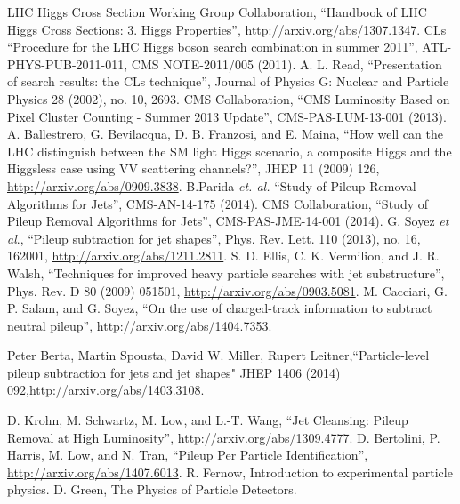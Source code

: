 \begin{thebibliography}{99}
 LHC Higgs Cross Section Working Group Collaboration, ``Handbook of LHC Higgs
Cross Sections: 3. Higgs Properties'',  \url{http://arxiv.org/abs/1307.1347}.
 CLs ``Procedure for the LHC Higgs boson search combination in summer 2011'', ATL-PHYS-PUB-2011-011, CMS NOTE-2011/005 (2011).
 {A. L. Read}, ``Presentation of search results: the CLs technique'', Journal of Physics G: Nuclear and Particle Physics 28 (2002), no. 10, 2693.
 CMS Collaboration, ``CMS Luminosity Based on Pixel Cluster Counting - Summer 2013 Update'', CMS-PAS-LUM-13-001 (2013).
 {A. Ballestrero}, G. Bevilacqua, D. B. Franzosi, and E. Maina, ``How well can the LHC
distinguish between the SM light Higgs scenario, a composite Higgs and the Higgsless
case using VV scattering channels?'', JHEP 11 (2009) 126, \url{http://arxiv.org/abs/0909.3838}.
 B.Parida {\it et. al.} ``Study of Pileup Removal Algorithms for Jets'', CMS-AN-14-175 (2014).
 CMS Collaboration, ``Study of Pileup Removal Algorithms for Jets'', CMS-PAS-JME-14-001 (2014).
 G. Soyez {\it et al}., ``Pileup subtraction for jet shapes'', Phys. Rev. Lett. 110 (2013), no. 16, 162001, \url{http://arxiv.org/abs/1211.2811}.
 S. D. Ellis, C. K. Vermilion, and J. R. Walsh, ``Techniques for improved heavy particle
searches with jet substructure'', Phys. Rev. D 80 (2009) 051501, \url{http://arxiv.org/abs/0903.5081}.
 M. Cacciari, G. P. Salam, and G. Soyez, ``On the use of charged-track information to subtract neutral pileup'', \url{http://arxiv.org/abs/1404.7353}.

 Peter Berta, Martin Spousta, David W. Miller, Rupert Leitner,``Particle-level pileup subtraction for jets and jet shapes" JHEP 1406 (2014) 092,\url{http://arxiv.org/abs/1403.3108}.

 D. Krohn, M. Schwartz, M. Low, and L.-T. Wang, ``Jet Cleansing: Pileup Removal at High
Luminosity'', \url{http://arxiv.org/abs/1309.4777}.
 D. Bertolini, P. Harris, M. Low, and N. Tran, ``Pileup Per Particle Identification'', \url{http://arxiv.org/abs/1407.6013}.
 R. Fernow, Introduction to experimental particle physics.
 D. Green, The Physics of Particle Detectors.
\end{thebibliography}
